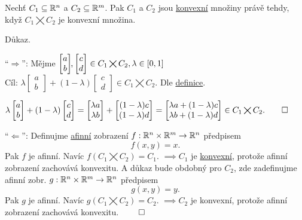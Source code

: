 Nechť $C_1 \subseteq \mathbb{R}^n$ a $C_2 \subseteq \mathbb{R}^m$. Pak $C_1$ a $C_2$ jsou \hyperref[sec:konvex]{konvexní} množiny právě 
tehdy, když $C_1 \bigtimes C_2$ je konvexní množina.

Důkaz.

\enquote{$\Rightarrow$}: Mějme
$
\begin{bmatrix}
    a \\
    b
\end{bmatrix}\hspace{-1mm}\text{,}
\begin{bmatrix}
    c \\
    d
\end{bmatrix} \in C_1 \bigtimes C_2, \lambda \in [0,1]$\\
Cíl:
$
\lambda \begin{bmatrix}
    a \\
    b
\end{bmatrix}
+ (1-\lambda)
\begin{bmatrix}
    c \\
    d
\end{bmatrix} \in C_1 \bigtimes C_2.$ Dle \hyperref[sec:konvex]{definice}.

$
\lambda \begin{bmatrix}
    a \\
    b
\end{bmatrix}
+ (1-\lambda)
\begin{bmatrix}
    c \\
    d
\end{bmatrix} =
\begin{bmatrix}
    \lambda a \\
    \lambda b
\end{bmatrix}
+
\begin{bmatrix}
    (1-\lambda)c \\
    (1-\lambda)d
\end{bmatrix}
=
\begin{bmatrix} %
    \lambda a + (1-\lambda)c \\
    \lambda b + (1-\lambda)d
\end{bmatrix} \in C_1 \bigtimes C_2. \qed$

\enquote{$\Leftarrow$}: Definujme \hyperref[sec:afin]{afinní} zobrazení $f : \mathbb{R}^n \times \mathbb{R}^m \rightarrow \mathbb{R}^n$ 
předpisem \[ f(x,y) = x \text{.}\]
Pak $f$ je afinní. Navíc $f(C_1 \bigtimes C_2) = C_1$. $\implies C_1$ je \hyperref[sec:konvex]{konvexní}, protože afinní
zobrazení zachovává konvexitu.
A důkaz bude obdobný pro $C_2$, zde zadefinujme afinní zobr. $g : \mathbb{R}^n \times \mathbb{R}^m \rightarrow \mathbb{R}^n$ předpisem
\[ g(x,y) = y \text{.}\]
Pak $g$ je afinní. Navíc $g(C_1 \bigtimes C_2) = C_2$. $\implies C_2$ je konvexní, protože afinní zobrazení zachovává
konvexitu. $\qed$

